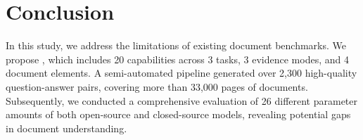 \vspace{-2mm}
\section{Conclusion}
In this study, we address the limitations of existing document benchmarks. We propose \benchName, which includes 20 capabilities across 3 tasks, 3 evidence modes, and 4 document elements. A semi-automated pipeline generated over 2,300 high-quality question-answer pairs, covering more than 33,000 pages of documents. Subsequently, we conducted a comprehensive evaluation of 26 different parameter amounts of both open-source and closed-source models, revealing potential gaps in document understanding.


